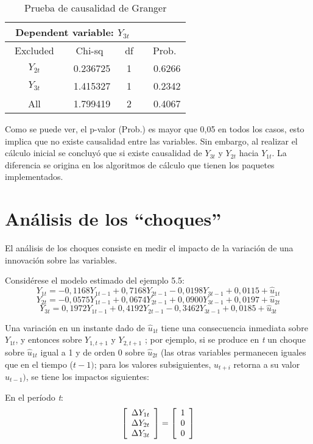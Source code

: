 \begin{table}[H]
\centering
\begin{tabular}{cccc}
\multicolumn{4}{l}{~Dependent variable: $Y_{3t}$} \\ \hline\hline
~Excluded~ & ~Chi-sq~ & ~df~ & ~Prob.~ \\ \hline\hline
$Y_{2t}$ & ~0.236725 & 1 & ~0.6266 \\ 
$Y_{3t}$ & ~1.415327 & 1 & ~0.2342 \\ \hline\hline
All & ~1.799419 & 2 & ~0.4067 \\ \hline\hline
\end{tabular}
\caption{Prueba de causalidad de Granger}
\end{table}

Como se puede ver, el p-valor (Prob.) es mayor que 0,05 en todos los casos, esto implica que no existe causalidad entre las variables. Sin embargo, al realizar el c\'{a}lculo inicial se concluy\'{o} que si existe causalidad de $Y_{3t}$ y $Y_{2t}$ hacia $Y_{1t}$. La diferencia se origina en los algoritmos de c\'{a}lculo que tienen los paquetes implementados.

\section{An\'{a}lisis de los ``choques''}
El an\'{a}lisis de los choques consiste en medir el impacto de la variaci\'{o}n de una innovaci\'{o}n sobre las variables.\newline

Consid\'{e}rese el modelo estimado del ejemplo 5.5:
\[
Y_{1t}=-0,1168Y_{1t-1}+0,7168Y_{2t-1}-0,0198Y_{3t-1}+0,0115+\hat{u}_{1t}
\]
\[
Y_{2t}=-0,0575Y_{1t-1}+0,0674Y_{2t-1}+0,0900Y_{3t-1}+0,0197+\hat{u}_{2t}
\]
\[
Y_{3t}=0,1972Y_{1t-1}+0,4192Y_{2t-1}-0,3462Y_{3t-1}+0,0185+\hat{u}_{3t}
\]

Una variaci\'{o}n en un instante dado de $\hat{u}_{1t}$ tiene una consecuencia inmediata sobre $Y_{1t}$, y entonces sobre $Y_{1,t+1}$ y $Y_{2,t+1}$ ; por ejemplo, si se produce en \textit{t} un choque sobre $\hat{u}_{1t}$ igual a 1 y de orden 0 sobre $\hat{u}_{2t}$ (las otras variables permanecen iguales que en el tiempo ($t-1)$; para los valores subsiguientes, $u_{t+i}$ retorna a su valor $u_{t-1})$, se tiene los impactos siguientes:\newline

En el per\'{i}odo \textit{t}: 
\[
\left[ {\begin{array}{*{20}c}
\Delta Y_{1t}\\
\Delta Y_{2t}\\
\Delta Y_{3t}\\
\end{array} } \right]=\left[ {\begin{array}{*{20}c}
1\\
0\\
0\\
\end{array} } \right]
\]

